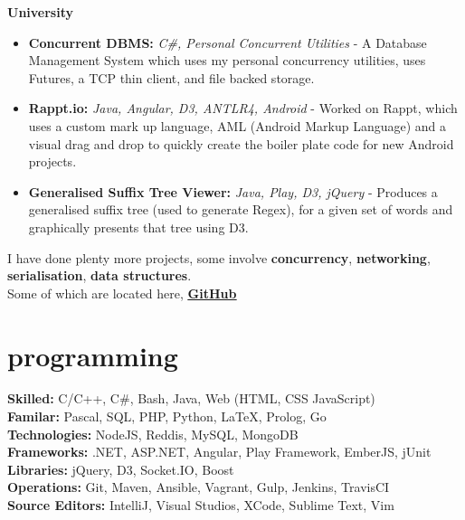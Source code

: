 \documentclass[]{friggeri-cv} %
\begin{document}
{
  \large\textbf{University}
}
\begin{itemize}
    \item \textbf{Concurrent DBMS:} \emph{C\#, Personal Concurrent Utilities} -
        A Database Management System which uses my personal concurrency utilities,
        uses Futures, a TCP thin client, and file backed storage.
    \item \textbf{Rappt.io:} \emph{Java, Angular, D3, ANTLR4, Android} -
        Worked on Rappt, which uses a custom mark up language, AML (Android Markup Language)
          and a visual drag and drop to quickly create the boiler plate code for new Android projects.
    \item \textbf{Generalised Suffix Tree Viewer:} \emph{Java, Play, D3, jQuery} -
        Produces a generalised suffix tree (used to generate Regex), for a given set of words and graphically
          presents that tree using D3.
\end{itemize}

I have done plenty more projects, some involve \textbf{concurrency}, \textbf{networking}, \textbf{serialisation}, \textbf{data structures}. \\
Some of which are located here, \underline{\textbf{\href{http://github.com/Compulsed/}{GitHub}}} \\


\section{programming}
    \textbf{Skilled:} C/C++, C\#, Bash, Java, Web (HTML, CSS JavaScript) \\
    \textbf{Familar:} Pascal, SQL, PHP, Python, LaTeX, Prolog, Go \\
    \textbf{Technologies:} NodeJS, Reddis, MySQL, MongoDB \\
    \textbf{Frameworks:} .NET, ASP.NET, Angular, Play Framework, EmberJS, jUnit \\
    \textbf{Libraries:} jQuery, D3, Socket.IO, Boost \\
    \textbf{Operations:} Git, Maven, Ansible, Vagrant, Gulp, Jenkins, TravisCI \\
    \textbf{Source Editors:} IntelliJ, Visual Studios, XCode, Sublime Text, Vim \\
\end{document}
